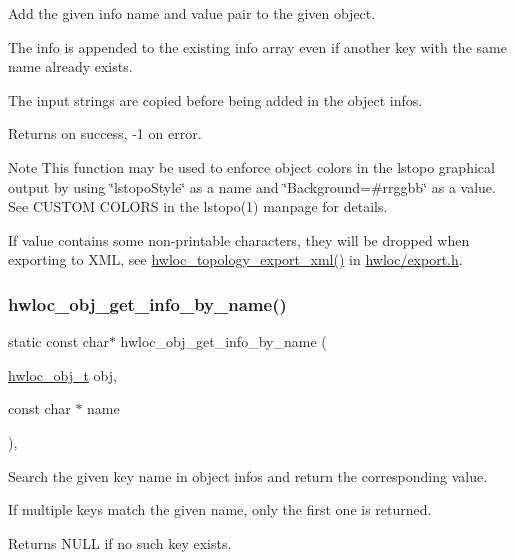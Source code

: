 Add the given info name and value pair to the given object. 

The info is appended to the existing info array even if another key with the same name already exists.

The input strings are copied before being added in the object infos.

\begin{DoxyReturn}{Returns}
{} on success, {\ttfamily -\/1} on error.
\end{DoxyReturn}
\begin{DoxyNote}{Note}
This function may be used to enforce object colors in the lstopo graphical output by using \char`\"{}lstopo\+Style\char`\"{} as a name and \char`\"{}\+Background=\#rrggbb\char`\"{} as a value. See C\+U\+S\+T\+OM C\+O\+L\+O\+RS in the lstopo(1) manpage for details.

If {\ttfamily value} contains some non-\/printable characters, they will be dropped when exporting to X\+ML, see \hyperlink{a00206_ga333f79975b4eeb28a3d8fad3373583ce}{hwloc\+\_\+topology\+\_\+export\+\_\+xml()} in \hyperlink{a00128_source}{hwloc/export.\+h}. 
\end{DoxyNote}
\mbox{\label{a00189_gab358661a92bb27d8542b255cc9f6f25e}} 
\subsubsection{\texorpdfstring{hwloc\+\_\+obj\+\_\+get\+\_\+info\+\_\+by\+\_\+name()}{hwloc\_obj\_get\_info\_by\_name()}}
{\footnotesize\ttfamily static const char$\ast$ hwloc\+\_\+obj\+\_\+get\+\_\+info\+\_\+by\+\_\+name (\begin{DoxyParamCaption}\item[{\hyperlink{a00185_ga79b8ab56877ef99ac59b833203391c7d}{hwloc\+\_\+obj\+\_\+t}}]{obj,  }\item[{const char $\ast$}]{name }\end{DoxyParamCaption})\hspace{0.3cm}{\ttfamily [inline]}, {\ttfamily [static]}}



Search the given key name in object infos and return the corresponding value. 

If multiple keys match the given name, only the first one is returned.

\begin{DoxyReturn}{Returns}
{\ttfamily N\+U\+LL} if no such key exists. 
\end{DoxyReturn}
